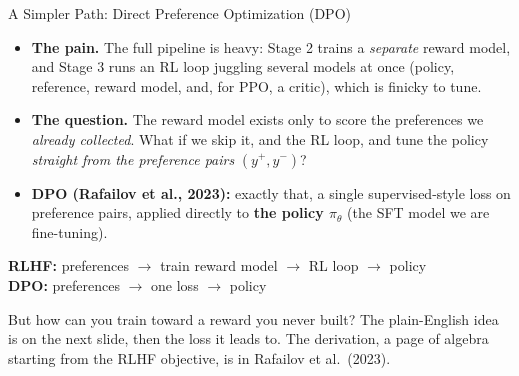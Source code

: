 \begin{frame}{A Simpler Path: Direct Preference Optimization (DPO)}
\begin{itemize}\itemsep0.45em\small
    \item \textbf{The pain.} The full pipeline is heavy: Stage 2 trains a
          \emph{separate} reward model, and Stage 3 runs an RL loop juggling several
          models at once (policy, reference, reward model, and, for PPO, a
          critic), which is finicky to tune.
    \item \textbf{The question.} The reward model exists only to score the
          preferences we \emph{already collected}. What if we skip it, and the RL
          loop, and tune the policy \emph{straight from the preference pairs}
          $(y^+, y^-)$?
    \item \textbf{DPO (Rafailov et al., 2023):} exactly that, a single
          supervised-style loss on preference pairs, applied directly to
          \textbf{the policy $\pi_\theta$} (the SFT model we are fine-tuning).
\end{itemize}
\vspace{0.4em}
\begin{center}\small
\setlength{\fboxsep}{5pt}%
\colorbox{boxblue!40}{\parbox{0.92\textwidth}{\centering
\textbf{RLHF:}\; preferences $\to$ train reward model $\to$ RL loop $\to$ policy\\[0.3em]
\textbf{DPO:}\;\; preferences $\to$ one loss $\to$ policy}}
\end{center}
\vspace{0.3em}
{\footnotesize But how can you train toward a reward you never built? The plain-English
idea is on the next slide, then the loss it leads to. The derivation, a page of algebra starting from the RLHF objective, is in Rafailov et al.\ (2023).}
\end{frame}

